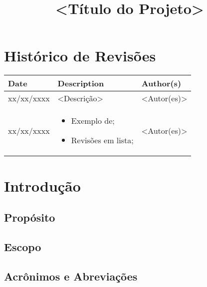 \documentclass{article}
\title{<Título do Projeto>}
\begin{document}
\newpage

\section*{\center Histórico de Revisões}
  \vspace*{1cm}
  \begin{table}[ht]
    \centering
    \begin{tabular}[pos]{|m{2cm} | m{7.2cm} | m{3.8cm}|} 
      \hline
      \cellcolor[gray]{0.9}
      \textbf{Date} & \cellcolor[gray]{0.9}\textbf{Description} & \cellcolor[gray]{0.9}\textbf{Author(s)}\\ \hline
      \hline
      \small xx/xx/xxxx & \small <Descrição> & \small <Autor(es)> \\ \hline      
      \small xx/xx/xxxx &
      \begin{small}
        \begin{itemize}
          \item Exemplo de;
          \item Revisões em lista;
        \end{itemize}
      \end{small} & \small <Autor(es)> \\ \hline 
    \end{tabular}
  \end{table}

\newpage

\tableofcontents
\newpage

\section{Introdução}

\subsection{Propósito}

\subsection{Escopo}
    
\subsection{Acrônimos e Abreviações}
  
\end{document}
